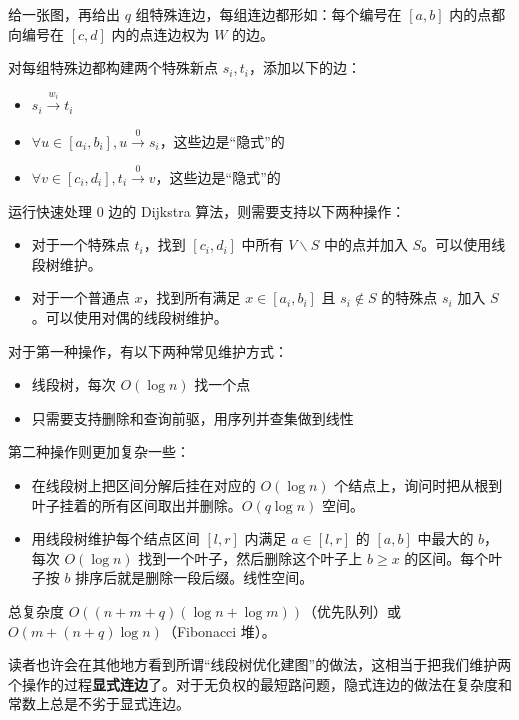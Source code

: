 \begin{example}
    给一张图，再给出 $q$ 组特殊连边，每组连边都形如：每个编号在 $[a,b]$ 内的点都向编号在 $[c,d]$ 内的点连边权为 $W$ 的边。
\end{example}
\begin{solution}
    对每组特殊边都构建两个特殊新点 $s_i,t_i$，添加以下的边：
    \begin{itemize}
        \item $s_i\overset{w_i}{\to}t_i$
        \item $\forall u\in [a_i,b_i], u\overset{0}{\to} s_i$，这些边是“隐式”的
        \item $\forall v\in [c_i,d_i], t_i\overset{0}{\to} v$，这些边是“隐式”的
    \end{itemize}
    运行快速处理 $0$ 边的 Dijkstra 算法，则需要支持以下两种操作：
    \begin{itemize}
        \item 对于一个特殊点 $t_i$，找到 $[c_i,d_i]$ 中所有 $V\backslash S$ 中的点并加入 $S$。可以使用线段树维护。
        \item 对于一个普通点 $x$，找到所有满足 $x\in [a_i,b_i]$ 且 $s_i\notin S$ 的特殊点 $s_i$ 加入 $S$。可以使用对偶的线段树维护。
    \end{itemize}
    对于第一种操作，有以下两种常见维护方式：
    \begin{itemize}
        \item 线段树，每次 $O(\log n)$ 找一个点 
        \item 只需要支持删除和查询前驱，用序列并查集做到线性
    \end{itemize}
    第二种操作则更加复杂一些：
    \begin{itemize}
        \item 在线段树上把区间分解后挂在对应的 $O(\log n)$ 个结点上，询问时把从根到叶子挂着的所有区间取出并删除。$O(q\log n)$ 空间。
        \item 用线段树维护每个结点区间 $[l,r]$ 内满足 $a\in [l,r]$ 的 $[a,b]$ 中最大的 $b$，每次 $O(\log n)$ 找到一个叶子，然后删除这个叶子上 $b\ge x$ 的区间。每个叶子按 $b$ 排序后就是删除一段后缀。线性空间。
    \end{itemize}
    总复杂度 $O((n+m+q)(\log n+\log m))$（优先队列）或 $O(m+(n+q)\log n)$（Fibonacci 堆）。
\end{solution}
\begin{remark}
    读者也许会在其他地方看到所谓“线段树优化建图”的做法，这相当于把我们维护两个操作的过程\textbf{显式连边}了。对于无负权的最短路问题，隐式连边的做法在复杂度和常数上总是不劣于显式连边。
\end{remark}

